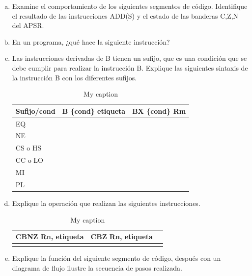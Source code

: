 \documentclass[a4paper,11pt]{article}                 %
\begin{document}
  \begin{enumerate}[a)]
  	\item Examine el comportamiento de los siguientes segmentos de código. Identifique el resultado de las instrucciones ADD(S) y el estado de las banderas C,Z,N del APSR. 
  	
  	\item  En un programa, ¿qué hace la siguiente instrucción?
  	
  	\item  Las instrucciones derivadas de B tienen un sufijo, que es una condición que se debe cumplir para realizar la instrucción B. Explique las siguientes sintaxis de la instrucción B con los diferentes sufijos. 
  	
  	\begin{table}[H]
  		\begin{tabular}{|l |l|l|}
  			\hline
  			Sufijo/cond & B \{cond\} etiqueta & BX \{cond\} Rm \\ \hline
  			EQ          &                     &                \\ \hline
  			NE          &                     &                \\ \hline
  			CS o HS     &                     &                \\ \hline
  			CC o LO     &                     &                \\ \hline
  			MI          &                     &                \\ \hline
  			PL          &                     &                \\ \hline
  		\end{tabular}
  	\centering
  	\caption{My caption}
  	\label{my-label}
  	\end{table}
  	
  	\item Explique la operación que realizan las siguientes instrucciones.  
  	
  	\begin{table}[H]
  		\begin{tabular}{|l |l|l|}
  			\hline
  			CBNZ Rn, etiqueta  & CBZ Rn, etiqueta  \\ \hline
  			         &                             \\ \hline
  		\end{tabular}
  		\centering
  		\caption{My caption}
  		\label{my-label}
  	\end{table}
  	
  	\item Explique la función del siguiente segmento de código, después con un diagrama de flujo ilustre la secuencia de pasos realizada. 
  	
  \end{enumerate}
 
\end{document}
